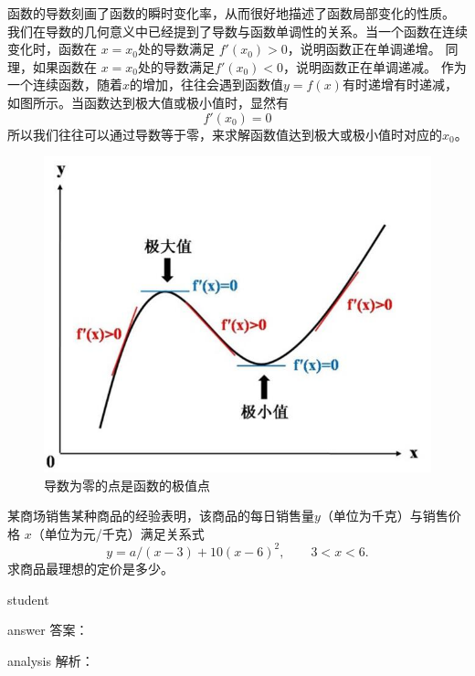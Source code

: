  函数的导数刻画了函数的瞬时变化率，从而很好地描述了函数局部变化的性质。
 我们在导数的几何意义中已经提到了导数与函数单调性的关系。当一个函数在连续变化时，函数在 $ x=x_0 $处的导数满足 $ f' (x_0)>0 $，说明函数正在单调递增。
 同理，如果函数在 $ x=x_0 $处的导数满足$ f' (x_0)<0 $，说明函数正在单调递减。
 作为一个连续函数，随着$ x $的增加，往往会遇到函数值$ y=f(x) $有时递增有时递减，如图所示。当函数达到极大值或极小值时，显然有
 \begin{equation}
  f' (x_0)=0
 \end{equation}
所以我们往往可以通过导数等于零，来求解函数值达到极大或极小值时对应的$ x_0 $。


\begin{figure}
\centering
\includegraphics[width=0.5\linewidth]{image/kinamatics-7}
\caption{导数为零的点是函数的极值点}
\label{fig:kinamatics-7}
\end{figure}


\begin{example}
	 某商场销售某种商品的经验表明，该商品的每日销售量$  y $（单位为千克）与销售价格 $ x $（单位为元/千克）满足关系式
	 \[
	  y=a/(x-3)+10(x-6)^2,\qquad 3<x<6.
	 \]
	 求商品最理想的定价是多少。
  
	
	\begin{taggedblock}{student}
		\vspace*{2cm}
	\end{taggedblock}
	
	
	\begin{taggedblock}{answer}
		答案：
	\end{taggedblock}
	
	
	\begin{taggedblock}{analysis}
		解析：
	\end{taggedblock}
\end{example}

